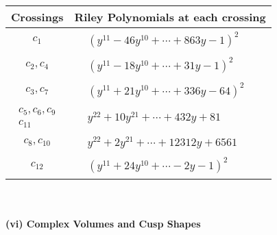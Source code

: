 \documentclass[1p]{elsarticle_modified}
\theoremstyle{definition}
\begin{document}
\begin{tabular}{m{50pt}|m{274pt}}
Crossings & \hspace{64pt}Riley Polynomials at each crossing \\
\hline $$\begin{aligned}c_{1}\end{aligned}$$&$\begin{aligned}
&(y^{11}-46 y^{10}+\cdots+863 y-1)^{2}
\end{aligned}$\\
\hline $$\begin{aligned}c_{2},c_{4}\end{aligned}$$&$\begin{aligned}
&(y^{11}-18 y^{10}+\cdots+31 y-1)^{2}
\end{aligned}$\\
\hline $$\begin{aligned}c_{3},c_{7}\end{aligned}$$&$\begin{aligned}
&(y^{11}+21 y^{10}+\cdots+336 y-64)^{2}
\end{aligned}$\\
\hline $$\begin{aligned}c_{5},c_{6},c_{9}\\c_{11}\end{aligned}$$&$\begin{aligned}
&y^{22}+10 y^{21}+\cdots+432 y+81
\end{aligned}$\\
\hline $$\begin{aligned}c_{8},c_{10}\end{aligned}$$&$\begin{aligned}
&y^{22}+2 y^{21}+\cdots+12312 y+6561
\end{aligned}$\\
\hline $$\begin{aligned}c_{12}\end{aligned}$$&$\begin{aligned}
&(y^{11}+24 y^{10}+\cdots-2 y-1)^{2}
\end{aligned}$\\
\hline
\end{tabular}\\~\\
\newpage\flushleft \textbf{(vi) Complex Volumes and Cusp Shapes}
\end{document}
